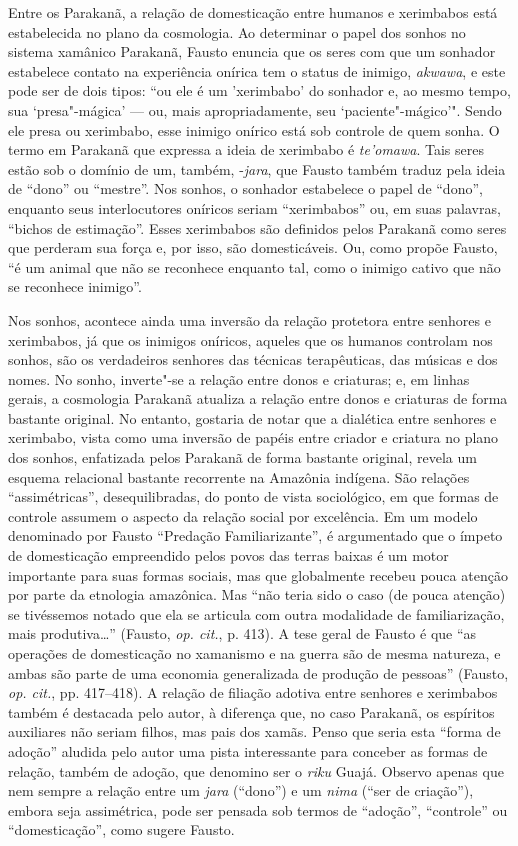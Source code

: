 Entre os Parakanã, a relação de domesticação entre humanos e xerimbabos
está estabelecida no plano da cosmologia. Ao determinar o papel dos
sonhos no sistema xamânico Parakanã, Fausto enuncia que os seres com que
um sonhador estabelece contato na experiência onírica tem o status de
inimigo, \emph{akwawa}, e este pode ser de dois tipos: ``ou ele é um
'xerimbabo' do sonhador e, ao mesmo tempo, sua `presa"-mágica' --- ou, mais
apropriadamente, seu `paciente"-mágico'". Sendo ele presa ou xerimbabo,
esse inimigo onírico está sob controle de quem sonha. O termo em
Parakanã que expressa a ideia de xerimbabo é \emph{te'omawa}. Tais seres
estão sob o domínio de um, também, -\emph{jara}, que Fausto também
traduz pela ideia de ``dono'' ou ``mestre''. Nos sonhos, o sonhador
estabelece o papel de ``dono'', enquanto seus interlocutores oníricos
seriam ``xerimbabos'' ou, em suas palavras, ``bichos de estimação''. Esses
xerimbabos são definidos pelos Parakanã como seres que perderam sua
força e, por isso, são domesticáveis. Ou, como propõe Fausto, ``é um
animal que não se reconhece enquanto tal, como o inimigo cativo que não
se reconhece inimigo''.

Nos sonhos, acontece ainda uma inversão da relação protetora entre
senhores e xerimbabos, já que os inimigos oníricos, aqueles que os
humanos controlam nos sonhos, são os verdadeiros senhores das técnicas
terapêuticas, das músicas e dos nomes. No sonho, inverte"-se a relação
entre donos e criaturas; e, em linhas gerais, a cosmologia Parakanã
atualiza a relação entre donos e criaturas de forma bastante original.
No entanto, gostaria de notar que a dialética entre senhores e
xerimbabo, vista como uma inversão de papéis entre criador e criatura no
plano dos sonhos, enfatizada pelos Parakanã de forma bastante original,
revela um esquema relacional bastante recorrente na Amazônia indígena.
São relações ``assimétricas'', desequilibradas, do ponto de vista
sociológico, em que formas de controle assumem o aspecto da relação
social por excelência. Em um modelo denominado por Fausto ``Predação
Familiarizante'', é argumentado que o ímpeto de domesticação empreendido
pelos povos das terras baixas é um motor importante para suas formas
sociais, mas que globalmente recebeu pouca atenção por parte da
etnologia amazônica. Mas ``não teria sido o caso (de pouca atenção) se
tivéssemos notado que ela se articula com outra modalidade de
familiarização, mais produtiva\ldots{}'' (Fausto, \emph{op. cit.}, p. 413). A tese
geral de Fausto é que ``as operações de domesticação no xamanismo e na
guerra são de mesma natureza, e ambas são parte de uma economia
generalizada de produção de pessoas'' (Fausto, \emph{op. cit.}, pp. 417--418). A
relação de filiação adotiva entre senhores e xerimbabos também é
destacada pelo autor, à diferença que, no caso Parakanã, os espíritos
auxiliares não seriam filhos, mas pais dos xamãs. Penso que seria esta
``forma de adoção'' aludida pelo autor uma pista interessante para
conceber as formas de relação, também de adoção, que denomino ser o
\emph{riku} Guajá. Observo apenas que nem sempre a relação entre um
\emph{jara} (``dono'') e um \emph{nima} (``ser de criação''), embora seja
assimétrica, pode ser pensada sob termos de ``adoção'', ``controle'' ou
``domesticação'', como sugere Fausto.

